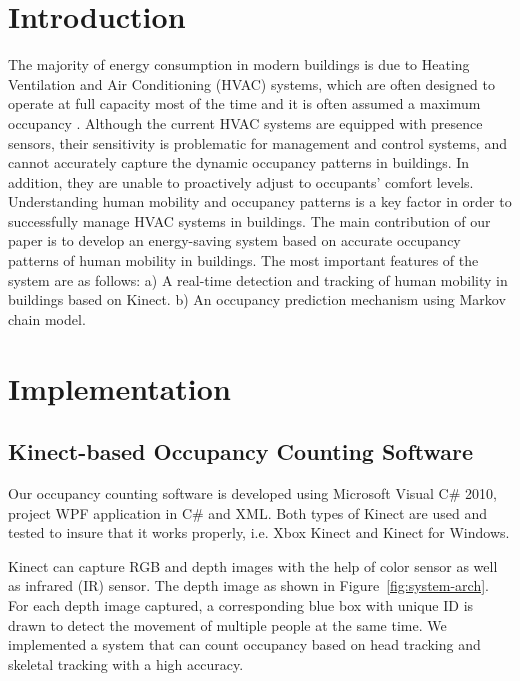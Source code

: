 \documentclass{sig-alternate}
\begin{document}
\section{Introduction}
\label{sec:introduction}
The majority of energy consumption in modern buildings is due to Heating Ventilation and Air Conditioning (HVAC) systems, which are often designed to operate at full capacity most of the time and it is often assumed a maximum occupancy \cite{ref:Wang2011}. Although the current HVAC systems are equipped with presence sensors, their sensitivity is problematic for management and control systems, and cannot accurately capture the dynamic occupancy patterns in buildings. In addition, they are unable to proactively adjust to occupants' comfort levels. Understanding human mobility and occupancy patterns is a key factor in order to successfully manage HVAC systems in buildings. The main contribution of our paper is to develop an energy-saving system based on accurate occupancy patterns of human mobility in buildings. The most important features of the system are as follows: a) A real-time detection and tracking of human mobility in buildings based on Kinect. b) An occupancy prediction mechanism using Markov chain model. %


\par






\section{Implementation}
\label{sec:implementation}

\subsection{Kinect-based Occupancy Counting Software}

Our occupancy counting software is developed using Microsoft Visual
C\# 2010, project WPF application in C\# and XML\@. Both types of
Kinect are used and tested to insure that it works properly, i.e. Xbox
Kinect and Kinect for Windows.    
\par

Kinect can capture RGB and depth images with the help of color sensor as well as infrared (IR) sensor. The depth image as shown in Figure~\ref{fig:system-arch}. For each depth image captured, a corresponding blue box with unique ID is drawn to detect the movement of multiple people at the same time. We implemented a system that can count occupancy based on head tracking and skeletal tracking with a high accuracy. 
\end{document}
